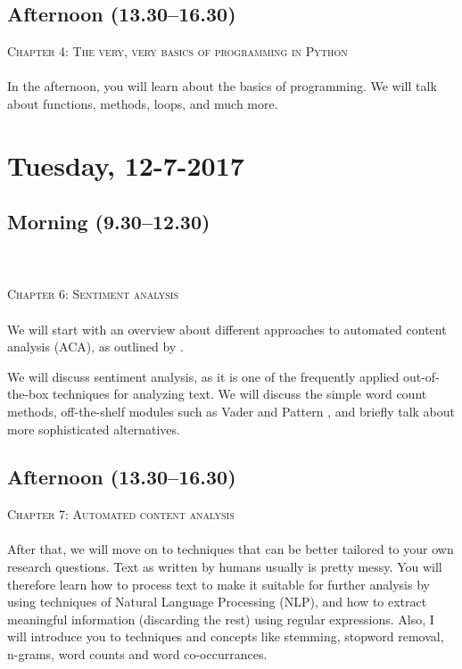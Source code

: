 \documentclass[a4paper,12pt]{report}
\begin{document}
\subsection*{Afternoon (13.30--16.30)}
\textsc{ Chapter 4: The very, very basics of programming in Python}\\
~\\
In the afternoon, you will learn about the basics of programming. We will talk about functions, methods, loops, and much more.



\section*{Tuesday, 12-7-2017}


\subsection*{Morning (9.30--12.30)}
\textsc{ \cite{Boumans2016}}\\
\textsc{ \cite{Gonzalez-Bailon2015}}\\
\textsc{ Chapter 6: Sentiment analysis}\\
~\\
We will start with an overview about different approaches to automated content analysis (ACA), as outlined by \cite{Boumans2016}. 

We will discuss sentiment analysis, as it is one of the frequently applied out-of-the-box techniques for analyzing text. We will discuss the simple word count methods, off-the-shelf modules such as Vader \citep{Hutto2014} and Pattern \citep{DeSmedt2012}, and briefly talk about more sophisticated alternatives.




\subsection*{Afternoon (13.30--16.30)}
\textsc{ Chapter 7: Automated content analysis}\\
~\\
After that, we will move on to techniques that can be better tailored to your own research questions. Text as written by humans usually is pretty messy. You will therefore learn how to process text to make it suitable for further analysis by using techniques of Natural Language Processing (NLP), and how to extract meaningful information (discarding the rest) using regular expressions. Also, I will introduce you to techniques and concepts like stemming, stopword removal, n-grams, word counts and word co-occurrances.
\end{document}
